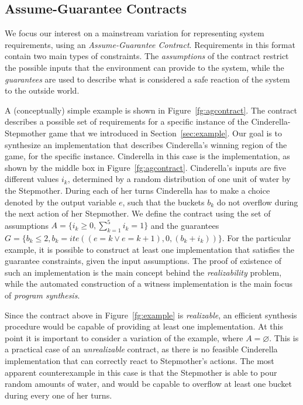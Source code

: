 \subsection{Assume-Guarantee Contracts}
\label{sec:pre}

We focus our interest on a mainstream variation for representing system requirements, using an \textit{Assume-Guarantee
Contract}. Requirements in this format contain two main types of constraints.
The \emph{assumptions} of the contract restrict the possible inputs that the
environment can provide to the system, while the \emph{guarantees} are used to
describe what is considered a safe reaction of the system to the outside world.

A (conceptually) simple example is shown in Figure~\ref{fg:agcontract}. The contract describes a possible set of requirements for a specific instance of the Cinderella-Stepmother game that we introduced in Section~\ref{sec:example}. Our goal is to synthesize an implementation that describes Cinderella's winning region of the game, for the specific instance. Cinderella in this case is the implementation, as shown by the middle box in Figure~\ref{fg:agcontract}. Cinderella's inputs are five different values $i_k$, determined by a random distribution of one unit of water by the Stepmother. During each of her turns Cinderella has to make a choice denoted by the output variable $e$, such that the buckets $b_k$ do not overflow during the next action of her Stepmother. We define the contract using the set of assumptions $A = \{i_k \geq 0, \sum_{k=1}^{5} i_k = 1\}$ and the guarantees $G = \{b_k \leq 2, b_k = ite((e=k \lor e=k+1), 0, (b_k+i_k))\}$. For the particular example, it is possible to construct at least one implementation that satisfies the guarantee constraints, given the input assumptions. The proof of existence of such an implementation  is the main concept behind the \emph{realizability} problem, while the automated construction of a witness implementation is the main focus of \emph{program synthesis}.


Since the contract above in Figure~\ref{fg:example} is \emph{realizable}, an efficient synthesis procedure would be capable of providing at least one
implementation. At this point it is important to consider a variation of the example, where $A = \varnothing$. This is a practical case of an
\emph{unrealizable} contract, as there is no feasible Cinderella implementation that can correctly react to Stepmother's actions. The most apparent counterexample in this case is that the Stepmother is able to pour random amounts of water, and would be capable to overflow at least one bucket during every one of her turns.

